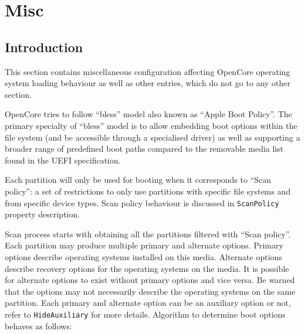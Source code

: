 \documentclass[]{article}
\makeatletter
\providecommand{\DIFaddtex}[1]{{\protect\color{blue}\uwave{#1}}} %
\renewcommand{\label}[1]{%
\zref@wrapper@immediate{\oldlabel{#1}}}  %
\providecommand{\DIFaddbegin}{\global\booltrue{DIFkeeppage}\global\booltrue{DIFchange}} %
\providecommand{\DIFaddend}{\global\booltrue{DIFkeeppage}\global\boolfalse{DIFchange}} %
\providecommand{\DIFadd}[1]{\texorpdfstring{\DIFaddtex{#1}}{#1}} %
\makeatother
\begin{document}


\section{Misc}\label{misc}

\subsection{Introduction}\label{miscintro}

This section contains miscellaneous configuration affecting OpenCore operating system loading behaviour
as well as other entries, which do not go to any other section.

OpenCore tries to follow ``bless'' model also known as ``Apple Boot Policy''. The primary specialty of
``bless'' model is to allow embedding boot options within the file system (and be accessible through a
specialised driver) as well as supporting a broader range of predefined boot paths compared to the
removable media list found in the UEFI specification.

Each partition will only be used for booting when it corresponds to ``Scan policy'': a set of restrictions
to only use partitions with specific file systems and from specific device types. Scan policy behaviour is
discussed in \texttt{ScanPolicy} property description.

Scan process starts with obtaining all the partitions filtered with ``Scan policy''. Each partition may
produce multiple primary and alternate options. Primary options describe operating systems installed
on this media. Alternate options describe recovery options for the operating systems on the media.
It is possible for alternate options to exist without primary options and vice versa. Be warned
that the options may not necessarily describe the operating systems on the same partition.
Each primary and alternate option can be an auxiliary option or not, refer to \texttt{HideAuxiliary}
for more details. Algorithm to determine boot options behaves as follows:
\end{document}
